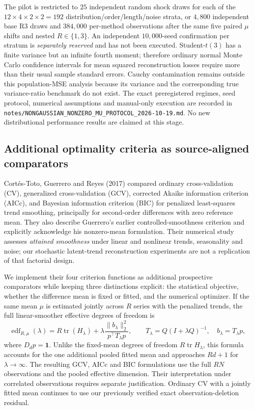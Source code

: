 \documentclass[11pt]{article}
\begin{document}
The pilot is restricted to $25$ independent random
shock draws for each of the $12\times4\times2\times2=192$
distribution/order/length/noise strata,
or $4{,}800$ independent base R3 draws and
$384{,}000$ per-method observations after
the same five paired $\mu$ shifts and nested
$R\in\{1,3\}$. An independent $10{,}000$-seed
confirmation per stratum is \emph{separately reserved}
and has not been executed.
Student-$t(3)$ has a finite variance but
an infinite fourth moment; therefore ordinary
normal Monte Carlo confidence intervals
for mean squared reconstruction losses require
more than their usual sample standard errors.
Cauchy contamination remains outside this
population-MSE analysis because its variance
and the corresponding true variance-ratio
benchmark do not exist. The exact preregistered
regimes, seed protocol, numerical assumptions and
manual-only execution are recorded in
\texttt{notes/NONGAUSSIAN\_NONZERO\_MU\_PROTOCOL\_2026-10-19.md}.
No new distributional performance results
are claimed at this stage.

\subsection{Additional optimality criteria as source-aligned comparators}

Cortés-Toto, Guerrero and Reyes (2017) compared
ordinary cross-validation (CV), generalized
cross-validation (GCV), corrected Akaike
information criterion (AICc), and Bayesian
information criterion (BIC) for penalized
least-squares trend smoothing, principally for
second-order differences with zero reference mean.
They also describe Guerrero's earlier
controlled-smoothness criterion and explicitly
acknowledge his nonzero-mean formulation.
Their numerical study assesses
\emph{attained smoothness} under linear and
nonlinear trends, seasonality and noise; our
stochastic latent-trend reconstruction experiments
are not a replication of that factorial design.

We implement their four criterion functions as
additional prospective comparators while keeping
three distinctions explicit: the statistical
objective, whether the difference mean is fixed
or fitted, and the numerical optimizer. If the
same mean $\mu$ is estimated jointly across $R$
series with the penalized trends, the full
linear-smoother effective degrees of freedom is
\begin{equation}\label{eq:joint-mean-edf-selection}
 \operatorname{edf}_{R,\mu}(\lambda)
 =R\operatorname{tr}(H_\lambda)
  +\lambda\frac{\|b_\lambda\|_2^2}
                    {p^\top T_\lambda p},
 \qquad
 T_\lambda=Q(I+\lambda Q)^{-1},
 \quad b_\lambda=T_\lambda p,
\end{equation}
where $D_dp=\mathbf1$. Unlike the fixed-mean
degrees of freedom $R\operatorname{tr}H_\lambda$,
this formula accounts for the one additional
pooled fitted mean and approaches $Rd+1$
for $\lambda\to\infty$. The resulting GCV,
AICc and BIC formulations use the full
$RN$ observations and the pooled
effective dimension. Their interpretation
under correlated observations requires separate
justification. Ordinary CV with a jointly
fitted mean continues to use our previously
verified exact observation-deletion residual.
\end{document}
